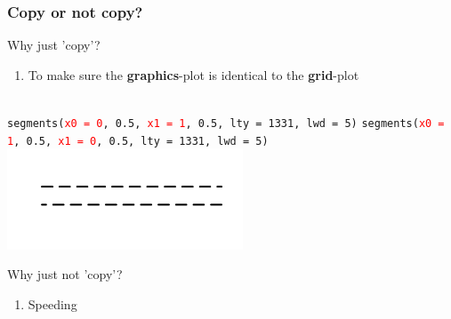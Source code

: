 \documentclass{beamer}
\begin{document}

\begin{frame}[fragile]
\frametitle{Copy or not copy?}
Why just 'copy'?

\begin{enumerate}
  \item To make sure the \textbf{graphics}-plot is identical to the \textbf{grid}-plot\\~\\
\end{enumerate}

\texttt{segments(\textcolor{red}{x0 = 0}, 0.5, \textcolor{red}{x1 = 1}, 0.5, lty = 1331, lwd = 5)}
\texttt{segments(\textcolor{red}{x0 = 1}, 0.5, \textcolor{red}{x1 = 0}, 0.5, lty = 1331, lwd = 5)}
\includegraphics[height = 3cm, width = 7cm]{plot/Rcopy.pdf}

Why just not 'copy'?
\begin{enumerate}
  \item Speeding
\end{enumerate}


\end{frame}


\end{document}
